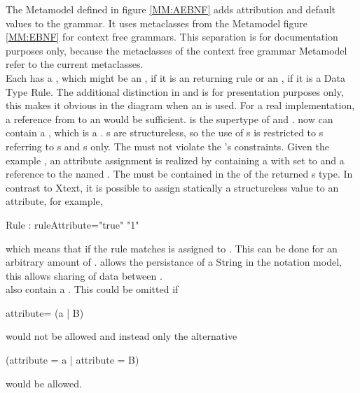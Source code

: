 The Metamodel defined in figure \ref{MM:AEBNF} adds attribution and default values to the grammar. It uses metaclasses from the Metamodel figure \ref{MM:EBNF} for context free grammars. This separation is for documentation purposes only, because the metaclasses of the context free grammar Metamodel refer to the current metaclasses. \\
Each  has a , which might be an , if it is an  returning rule or an , if it is a Data Type Rule. The additional distinction in  and  is for presentation purposes only, this makes it obvious in the diagram when an  is used. For a real implementation, a reference from  to an  would be sufficient.  is the supertype of  and .  now can contain a  , which is a .  s are structureless, so the use of s is restricted to  s referring to s and  s only. The  must not violate the 's constraints. Given the example , an attribute assignment is realized by  containing a   with  set to   and a reference to the   named . The  must be contained in the   of the returned s type. In contrast to Xtext, it is possible to assign statically a structureless value to an attribute, for example, 
\begin{xtxt}
Rule : {ruleAttribute="true"} "1"
\end{xtxt}   
which means that if the rule matches  is assigned to . This can be done for an arbitrary amount of .  allows the persistance of a String in the notation model, this allows sharing of data between . \\
 also contain a . This could be omitted if 
\begin{xtxt}
attribute= (a | B)
\end{xtxt}
would not be allowed and instead only the alternative 
\begin{xtxt}
(attribute = a | attribute = B)
\end{xtxt}
would be allowed.
